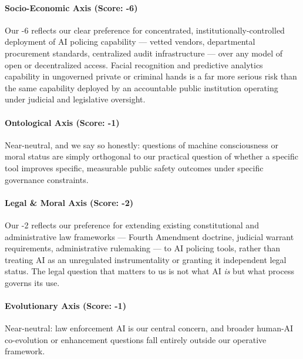 \paragraph{Socio-Economic Axis (Score:
-6)}\label{socio-economic-axis-score--6-1}

Our -6 reflects our clear preference for concentrated,
institutionally-controlled deployment of AI policing capability ---
vetted vendors, departmental procurement standards, centralized audit
infrastructure --- over any model of open or decentralized access.
Facial recognition and predictive analytics capability in ungoverned
private or criminal hands is a far more serious risk than the same
capability deployed by an accountable public institution operating under
judicial and legislative oversight.

\paragraph{Ontological Axis (Score:
-1)}\label{ontological-axis-score--1}

Near-neutral, and we say so honestly: questions of machine consciousness
or moral status are simply orthogonal to our practical question of
whether a specific tool improves specific, measurable public safety
outcomes under specific governance constraints.

\paragraph{Legal \& Moral Axis (Score:
-2)}\label{legal-moral-axis-score--2-1}

Our -2 reflects our preference for extending existing constitutional and
administrative law frameworks --- Fourth Amendment doctrine, judicial
warrant requirements, administrative rulemaking --- to AI policing
tools, rather than treating AI as an unregulated instrumentality or
granting it independent legal status. The legal question that matters to
us is not what AI \emph{is} but what process governs its use.

\paragraph{Evolutionary Axis (Score:
-1)}\label{evolutionary-axis-score--1-3}

Near-neutral: law enforcement AI is our central concern, and broader
human-AI co-evolution or enhancement questions fall entirely outside our
operative framework.

